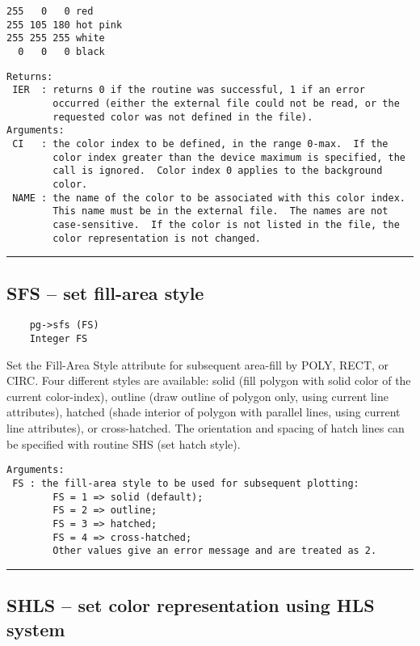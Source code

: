 \begin{verbatim}
255   0   0 red
255 105 180 hot pink
255 255 255 white
  0   0   0 black
\end{verbatim}

\begin{verbatim}
Returns:
 IER  : returns 0 if the routine was successful, 1 if an error
        occurred (either the external file could not be read, or the
        requested color was not defined in the file). 
Arguments:
 CI   : the color index to be defined, in the range 0-max.  If the
        color index greater than the device maximum is specified, the
        call is ignored.  Color index 0 applies to the background
        color. 
 NAME : the name of the color to be associated with this color index.
        This name must be in the external file.  The names are not
        case-sensitive.  If the color is not listed in the file, the
        color representation is not changed. 
\end{verbatim}

\hrule

\subsection*{SFS -- set fill-area style }

\begin{verbatim}
    pg->sfs (FS)
    Integer FS
\end{verbatim}

Set the Fill-Area Style attribute for subsequent area-fill by POLY,
RECT, or CIRC.  Four different styles are available: solid (fill
polygon with solid color of the current color-index), outline (draw
outline of polygon only, using current line attributes), hatched
(shade interior of polygon with parallel lines, using current line
attributes), or cross-hatched.  The orientation and spacing of hatch
lines can be specified with routine SHS (set hatch style).

\begin{verbatim}
Arguments:
 FS : the fill-area style to be used for subsequent plotting: 
        FS = 1 => solid (default);
        FS = 2 => outline;
        FS = 3 => hatched;
        FS = 4 => cross-hatched;
        Other values give an error message and are treated as 2. 
\end{verbatim}

\hrule

\subsection*{SHLS -- set color representation using HLS system }

